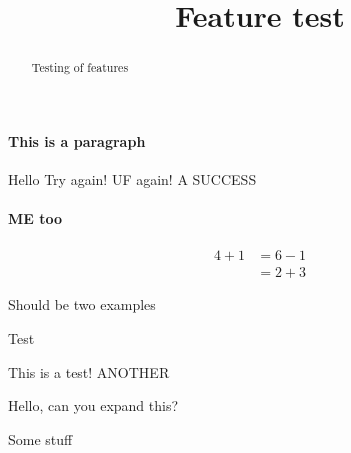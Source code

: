 \documentclass{ximera}
\title{Feature test}
\begin{document}
\begin{abstract}
    Testing of features
\end{abstract}
\maketitle

\paragraph{This is a paragraph}

\begin{problem}
  Hello Try again!
UF again! A SUCCESS
\paragraph{ME too}
\end{problem}
\begin{image}
\end{image}

\begin{align*}
  4+1 &= 6-1\\
  &= 2+3
\end{align*}


Should be two examples

\begin{solution}
\end{solution}

\be
Test
\ee

\begin{center}
\end{center}

This is a test! ANOTHER

\begin{theorem}
  Hello, can you expand this?
  \begin{expandable}
    Some stuff
  \end{expandable}
\end{theorem}
\end{document}
